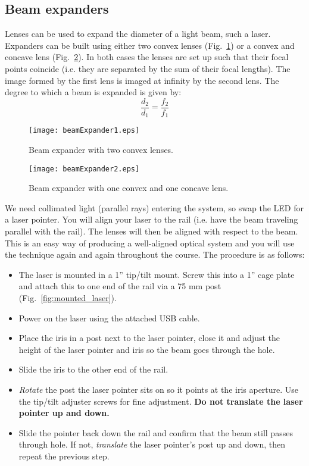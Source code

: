 \documentclass[a4paper]{report}
\begin{document}
	
	
	\clearpage
	
	
	\subsection{Beam expanders}
	Lenses can be used to expand the diameter of a light beam, such a laser.
	Expanders can be built using either two convex lenses (Fig.~\ref{beamExpander1}) or a convex and concave lens (Fig.~\ref{beamExpander2}). 
	In both cases the lenses are set up such that their focal points coincide (i.e. they are separated by the sum of their focal lengths). 
	The image formed by the first lens is imaged at infinity by the second lens.
	The degree to which a beam is expanded is given by:
	\begin{equation}
	\frac{d_2}{d_1}=\frac{f_2}{f_1}
	\label{eq:beamExp}
	\end{equation}
	
	\begin{figure}[h]
		\center
		\texttt{[image: beamExpander1.eps]}
		\caption{Beam expander with two convex lenses.}
		\label{beamExpander1}
	\end{figure}
	
	\begin{figure}[h]
		\center
		\texttt{[image: beamExpander2.eps]}
		\caption{Beam expander with one convex and one concave lens.}
		\label{beamExpander2}
	\end{figure}
	
	We need collimated light (parallel rays) entering the system, so swap the LED for a laser pointer.
	You will align your laser to the rail (i.e. have the beam traveling parallel with the rail). 
	The lenses will then be aligned with respect to the beam. 
	This is an easy way of producing a well-aligned optical system and you will use the technique again and again throughout the course.
	The procedure is as follows:
	
	\begin{itemize}
		\item The laser is mounted in a 1'' tip/tilt mount. Screw this into a 1'' cage plate and attach this to one end of the rail via a 75 mm post (Fig.~\ref{fig:mounted_laser}).
		\item Power on the laser using the attached USB cable.
		\item Place the iris in a post next to the laser pointer, close it and adjust the height of the laser pointer and iris so the beam goes through the hole. 
		\item Slide the iris to the other end of the rail. 
		\item \textit{Rotate} the post the laser pointer sits on so it points at the iris aperture. Use the tip/tilt adjuster screws for fine adjustment.
		\textbf{Do not translate the laser pointer up and down.}
		\item Slide the pointer back down the rail and confirm that the beam still passes through hole. 
		If not, \textit{translate} the laser pointer's post up and down, then repeat the previous step.
	\end{itemize}
	
\end{document}
